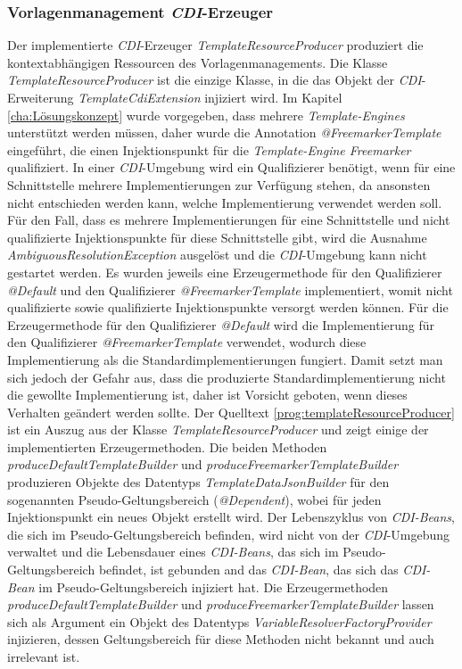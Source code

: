 \subsubsection{Vorlagenmanagement \emph{CDI}-Erzeuger}
Der implementierte \emph{CDI}-Erzeuger \emph{TemplateResourceProducer} produziert die kontextabhängigen Ressourcen des Vorlagenmanagements. Die Klasse \emph{TemplateResourceProducer} ist die einzige Klasse, in die das Objekt der \emph{CDI}-Erweiterung \emph{TemplateCdiExtension} injiziert wird. 
\newline
\newline
Im Kapitel \ref{cha:Lösungskonzept} wurde vorgegeben, dass mehrere \emph{Template-Engines} unterstützt werden müssen, daher wurde die Annotation \emph{@FreemarkerTemplate} eingeführt, die einen Injektionspunkt für die \emph{Template-Engine Freemarker} qualifiziert. In einer \emph{CDI}-Umgebung wird ein Qualifizierer benötigt, wenn für eine Schnittstelle mehrere Implementierungen zur Verfügung stehen, da ansonsten nicht entschieden werden kann, welche Implementierung verwendet werden soll. Für den Fall, dass es mehrere Implementierungen für eine Schnittstelle und nicht qualifizierte Injektionspunkte für diese Schnittstelle gibt, wird die Ausnahme \emph{AmbiguousResolutionException} ausgelöst und die \emph{CDI}-Umgebung kann nicht gestartet werden. 
\newline
\newline
Es wurden jeweils eine Erzeugermethode für den Qualifizierer \emph{@Default} und den Qualifizierer \emph{@FreemarkerTemplate} implementiert, womit nicht qualifizierte sowie qualifizierte Injektionspunkte versorgt werden können. Für die Erzeugermethode für den Qualifizierer \emph{@Default} wird die Implementierung für den Qualifizierer \emph{@FreemarkerTemplate} verwendet, wodurch diese Implementierung als die Standardimplementierungen fungiert. Damit setzt man sich jedoch der Gefahr aus, dass die produzierte Standardimplementierung nicht die gewollte Implementierung ist, daher ist Vorsicht geboten, wenn dieses Verhalten geändert werden sollte. 
\newline
\newline
Der Quelltext \ref{prog:templateResourceProducer} ist ein Auszug aus der Klasse \emph{TemplateResourceProducer} und zeigt einige der implementierten Erzeugermethoden. 
\newline
\newline
Die beiden Methoden \emph{produceDefaultTemplateBuilder} und \emph{produceFreemarkerTemplateBuilder} produzieren Objekte des Datentyps  \emph{TemplateDataJsonBuilder} für den sogenannten Pseudo-Geltungsbereich (\emph{@Dependent}), wobei für jeden Injektionspunkt ein neues Objekt erstellt wird. Der Lebenszyklus von \emph{CDI-Beans}, die sich im Pseudo-Geltungsbereich befinden, wird nicht von der \emph{CDI}-Umgebung verwaltet und die Lebensdauer eines \emph{CDI-Beans}, das sich im Pseudo-Geltungsbereich befindet, ist gebunden and das \emph{CDI-Bean}, das sich das \emph{CDI-Bean} im Pseudo-Geltungsbereich injiziert hat. Die Erzeugermethoden \emph{produceDefaultTemplateBuilder} und \emph{produceFreemarkerTemplateBuilder} lassen sich als Argument ein Objekt des Datentyps  \emph{VariableResolverFactoryProvider} injizieren, dessen Geltungsbereich für diese Methoden nicht bekannt und auch irrelevant ist.
